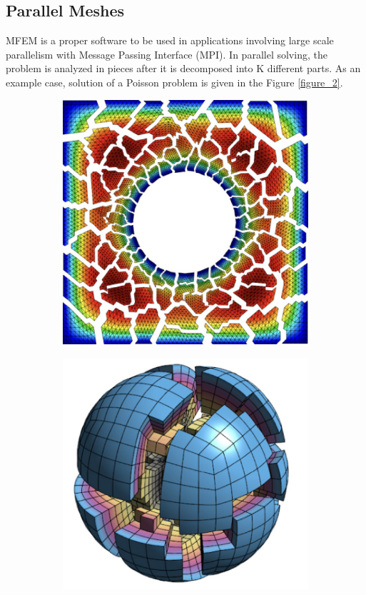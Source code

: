 \documentclass{article}
\begin{document}
\subsection{Parallel Meshes}
MFEM is a proper software to be used in applications involving large scale parallelism with Message Passing Interface (MPI). In parallel solving, the problem is analyzed in pieces after it is decomposed into K different parts. As an example case, solution of a Poisson problem is given in the Figure \ref{figure_2}. 
\begin{figure}[hbt!]
\centering
\begin{subfigure}{0.4\textwidth}
    \includegraphics[width=\textwidth]{Figures/Figure_2_1.png}
\end{subfigure}
\hfill
\begin{subfigure}{0.4\textwidth}
    \includegraphics[width=\textwidth]{Figures/Figure_2_2.png}

\end{subfigure}
\end{figure}
\end{document}
